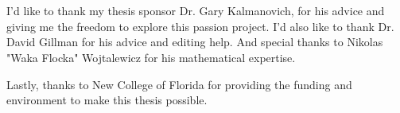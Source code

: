 \section*{}

I'd like to thank my thesis sponsor Dr. Gary Kalmanovich, for his advice and giving me the freedom to explore this passion project. I'd also like to thank Dr. David Gillman for his advice and editing help. And special thanks to Nikolas "Waka Flocka" Wojtalewicz for his mathematical expertise.

Lastly, thanks to New College of Florida for providing the funding and environment to make this thesis possible.

